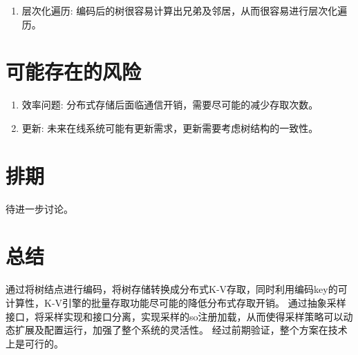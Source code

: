 \documentclass[10pt]{article}
\begin{document}
\begin{enumerate}
\item 层次化遍历: 编码后的树很容易计算出兄弟及邻居，从而很容易进行层次化遍历。
\end{enumerate}

\section{可能存在的风险}
\begin{enumerate}
\item 效率问题: 分布式存储后面临通信开销，需要尽可能的减少存取次数。
\item 更新: 未来在线系统可能有更新需求，更新需要考虑树结构的一致性。
\end{enumerate}

\section{排期}
待进一步讨论。

\section{总结}
通过将树结点进行编码，将树存储转换成分布式K-V存取，同时利用编码key的可计算性，K-V引擎的批量存取功能尽可能的降低分布式存取开销。
通过抽象采样接口，将采样实现和接口分离，实现采样的so注册加载，从而使得采样策略可以动态扩展及配置运行，加强了整个系统的灵活性。
经过前期验证，整个方案在技术上是可行的。
\end{document}

